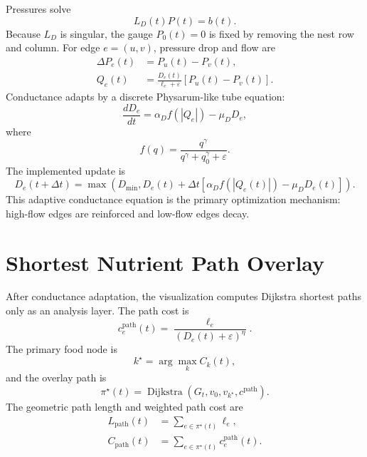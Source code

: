 \documentclass[11pt]{article}
\begin{document}
Pressures solve
\begin{equation}
  L_D(t)P(t)=b(t).
\end{equation}
Because $L_D$ is singular, the gauge $P_0(t)=0$ is fixed by removing the nest row
and column. For edge $e=(u,v)$, pressure drop and flow are
\begin{align}
  \Delta P_e(t)&=P_u(t)-P_v(t),\\
  Q_e(t)&=\frac{D_e(t)}{\ell_e+\varepsilon}\left[P_u(t)-P_v(t)\right].
\end{align}
Conductance adapts by a discrete Physarum-like tube equation:
\begin{equation}
  \frac{dD_e}{dt}=\alpha_D f(|Q_e|)-\mu_DD_e,
\end{equation}
where
\begin{equation}
  f(q)=\frac{q^\gamma}{q^\gamma+q_0^\gamma+\varepsilon}.
\end{equation}
The implemented update is
\begin{equation}
  D_e(t+\Delta t)=
  \max\left(
  D_{\min},
  D_e(t)+\Delta t\left[
  \alpha_Df(|Q_e(t)|)-\mu_DD_e(t)
  \right]
  \right).
\end{equation}
This adaptive conductance equation is the primary optimization mechanism:
high-flow edges are reinforced and low-flow edges decay.

\section{Shortest Nutrient Path Overlay}
After conductance adaptation, the visualization computes Dijkstra shortest
paths only as an analysis layer. The path cost is
\begin{equation}
  c_e^{\mathrm{path}}(t)=\frac{\ell_e}{(D_e(t)+\varepsilon)^\eta}.
\end{equation}
The primary food node is
\begin{equation}
  k^\star=\arg\max_k C_k(t),
\end{equation}
and the overlay path is
\begin{equation}
  \pi^\star(t)=\operatorname{Dijkstra}(G_t,v_0,v_{k^\star},c^{\mathrm{path}}).
\end{equation}
The geometric path length and weighted path cost are
\begin{align}
  L_{\mathrm{path}}(t)&=\sum_{e\in\pi^\star(t)}\ell_e,\\
  C_{\mathrm{path}}(t)&=\sum_{e\in\pi^\star(t)}c_e^{\mathrm{path}}(t).
\end{align}
\end{document}
